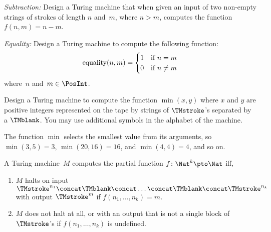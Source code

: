 \documentclass[../../../include/open-logic-section]{subfiles}
\begin{document}
\begin{prob}
\emph{Subtraction:} Design a Turing machine that when given an input
of two non-empty strings of strokes of length $n$ and~$m$, where $n >
m$, computes the function $f(n,m) = n - m$.
\end{prob}

\begin{prob}
\emph{Equality:} Design a Turing machine to compute the following function:
\[
\fn{equality}(n,m) = 
\begin{cases}
  \text{1} & \text{if~$n = m$} \\
  \text{0} & \text{if~$n \neq m$}
\end{cases}
\]
where~$n$ and~$m \in \PosInt$.
\end{prob}

\begin{prob}
Design a Turing machine to compute the function $\min(x,y)$ where $x$
and $y$ are positive integers represented on the tape by strings of
$\TMstroke$'s separated by a $\TMblank$. You may use additional
symbols in the alphabet of the machine.

The function $\min$ selects the smallest value from its arguments, so
$\min(3,5)=3$, $\min(20,16)=16$, and $\min(4,4)=4$, and so on.
\end{prob}

\begin{defn}
  A Turing machine~$M$ computes the partial function $f\colon \Nat^k
  \pto \Nat$ iff, 
  \begin{enumerate}
    \item $M$ halts on input $\TMstroke^{n_1}\concat\TMblank\concat
    \dots \concat\TMblank\concat\TMstroke^{n_k}$ with output $\TMstroke^{m}$ if $f(n_1, \dots, n_k) = m$.
    \item $M$ does not halt at all, or with an output that is not a
    single block of~$\TMstroke$'s if $f(n_1, \dots, n_k)$ is undefined.
  \end{enumerate}
\end{defn}
\end{document}
